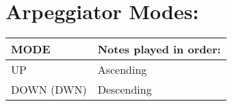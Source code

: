 \section{Arpeggiator Modes:}
\begin{tabular}{|l|l|}
\hline
\rowcolor[HTML]{C0C0C0} 
MODE                                  & Notes played in order:                                                                                                                                                                        \\ \hline
UP                                    & Ascending                                                                                                                                                    \\ \hline
DOWN (DWN)                           &  Descending                                                                            \\ \hline


\end{tabular}

